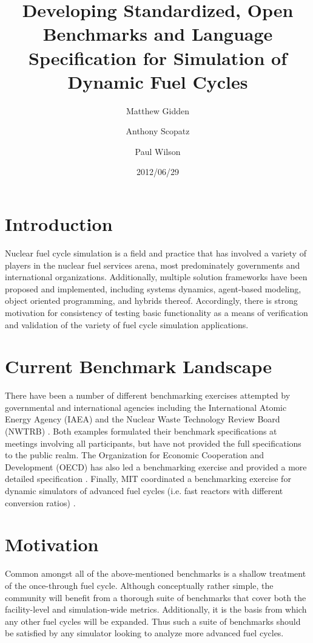 \documentclass{anstrans}
\title{Developing Standardized, Open Benchmarks and Language Specification for 
Simulation of Dynamic Fuel Cycles}
\author[*]{Matthew Gidden}
\author[$\dag$]{Anthony Scopatz}
\author[*]{Paul Wilson}
\affil[*]{Department of Nuclear Engineering \& Engineering Physics, 
University of Wisconsin - Madison, Madison, WI, 53703}
\affil[$\dag$]{The Flash Center for Computational Science, University 
of Chicago, Chicago, IL, 60637}
\date{2012/06/29}
\begin{document}
\section{Introduction}
Nuclear fuel cycle simulation is a field and practice that has involved a
variety of players in the nuclear fuel services arena, most predominately
governments and international organizations.  Additionally, multiple solution
frameworks have been proposed and implemented, including systems dynamics,
agent-based modeling, object oriented programming, and hybrids
thereof. Accordingly, there is strong motivation for consistency of testing
basic functionality as a means of verification and validation of the variety of
fuel cycle simulation applications.

\section{Current Benchmark Landscape}
There have been a number of different benchmarking exercises attempted by
governmental and international agencies including the International Atomic
Energy Agency (IAEA) \cite{_international_2011} and the Nuclear Waste Technology
Review Board (NWTRB) \cite{_nuclear_2011}.  Both examples formulated their
benchmark specifications at meetings involving all participants, but have not
provided the full specifications to the public realm. The Organization for
Economic Cooperation and Development (OECD) has also led a benchmarking exercise
\cite{boucher_benchmark_2012} and provided a more detailed specification
\cite{boucher_specification_2008}. Finally, MIT coordinated a benchmarking
exercise for dynamic simulators of advanced fuel cycles (i.e. fast reactors with
different conversion ratios) \cite{guerin_benchmark_2009}.

\section{Motivation}
Common amongst all of the above-mentioned benchmarks is a shallow treatment of
the once-through fuel cycle. Although conceptually rather simple, the community
will benefit from a thorough suite of benchmarks that cover both the
facility-level and simulation-wide metrics. Additionally, it is the basis from
which any other fuel cycles will be expanded.  Thus such a suite of benchmarks
should be satisfied by any simulator looking to analyze more advanced fuel
cycles.
\end{document}
